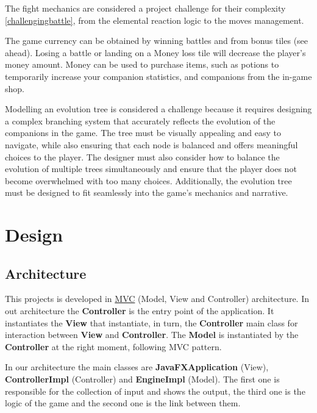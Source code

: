\documentclass[12pt, a4paper]{report}
\begin{document}
    The fight mechanics are considered a project challenge for their complexity \ref{challengingbattle}, from the elemental reaction logic to the moves management.

    The game currency can be obtained by winning battles and from bonus tiles (see ahead).
    Losing a battle or landing on a Money loss tile will decrease the player's money amount.
    Money can be used to purchase items, such as potions to temporarily increase your companion statistics, and companions from the in-game shop.

    Modelling an evolution tree is considered a challenge because it requires designing a complex branching system that accurately reflects the evolution of the companions in the game. 
    The tree must be visually appealing and easy to navigate, while also ensuring that each node is balanced and offers meaningful choices to the player. 
    The designer must also consider how to balance the evolution of multiple trees simultaneously and ensure that the player does not become overwhelmed with too many choices. 
    Additionally, the evolution tree must be designed to fit seamlessly into the game's mechanics and narrative.

\chapter{Design}

\section{Architecture}

    This projects is developed in \href{https://en.wikipedia.org/wiki/Model%E2%80%93view%E2%80%93controller}{MVC} (Model, View and Controller) architecture.
    In out architecture the \textbf{Controller} is the entry point of the application. It instantiates the \textbf{View} that instantiate, in turn, the
    \textbf{Controller} main class for interaction between \textbf{View} and \textbf{Controller}. The \textbf{Model} is instantiated by the \textbf{Controller}
    at the right moment, following MVC pattern.

    In our architecture the main classes are \textbf{JavaFXApplication} (View), \textbf{ControllerImpl} (Controller) and \textbf{EngineImpl} (Model). The
    first one is responsible for the collection of input and shows the output, the third one is the logic of the game and the second one is the link between them.
\end{document}
